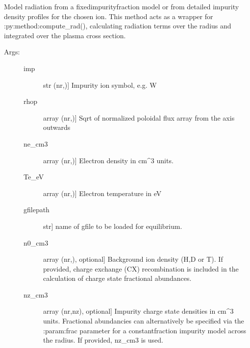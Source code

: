 \documentclass[letterpaper,10pt,english]{sphinxmanual}
\begin{document}
\begin{fulllineitems}
\label{\detokenize{aurora:aurora.radiation.radiation_model}}
Model radiation from a fixed\sphinxhyphen{}impurity\sphinxhyphen{}fraction model or from detailed impurity density
profiles for the chosen ion. This method acts as a wrapper for :py:method:compute\_rad(), 
calculating radiation terms over the radius and integrated over the plasma cross section.
\begin{description}
\item[{Args:}] \leavevmode\begin{description}
\item[{imp}] \leavevmode{[}str (nr,){]}
Impurity ion symbol, e.g. W

\item[{rhop}] \leavevmode{[}array (nr,){]}
Sqrt of normalized poloidal flux array from the axis outwards

\item[{ne\_cm3}] \leavevmode{[}array (nr,){]}
Electron density in cm\textasciicircum{}\sphinxhyphen{}3 units.

\item[{Te\_eV}] \leavevmode{[}array (nr,){]}
Electron temperature in eV

\item[{gfilepath}] \leavevmode{[}str{]}
name of gfile to be loaded for equilibrium.

\item[{n0\_cm3}] \leavevmode{[}array (nr,), optional{]}
Background ion density (H,D or T). If provided, charge exchange (CX) 
recombination is included in the calculation of charge state fractional 
abundances.

\item[{nz\_cm3}] \leavevmode{[}array (nr,nz), optional{]}
Impurity charge state densities in cm\textasciicircum{}\sphinxhyphen{}3 units. Fractional abundancies can 
alternatively be specified via the :param:frac parameter for a constant\sphinxhyphen{}fraction
impurity model across the radius. If provided, nz\_cm3 is used.


\end{description}
\end{description}
\end{fulllineitems}
\end{document}
